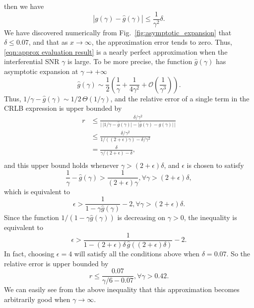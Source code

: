 \documentclass[12pt,draftclsnofoot,journal,onecolumn]{IEEEtran}
\theoremstyle{nonumberplain}
\begin{document}
    then we have 
    \begin{equation}
        \left| g(\gamma) - \hat{g}(\gamma)\right| \leq \frac{1}{\gamma^2} \delta. 
    \end{equation}
    We have discovered numerically from Fig.~\ref{fig:asymptotic_expansion} that $\delta \leq 0.07$, and that as $x\to \infty$, the approximation error tends to zero. Thus, \eqref{eqn:approx evaluation result} is a nearly perfect approximation when the interferential SNR $\gamma$ is large. To be more precise, the function $\hat{g}(\gamma)$ has asymptotic expansion at $\gamma \to +\infty$
    \begin{equation}
        \hat{g}(\gamma) \sim \frac{1}{2}\left(\frac{1}{\gamma} + \frac{1}{4\gamma^2} + \mathcal{O}(\frac{1}{\gamma^3})\right).
    \end{equation}
    Thus, $1/\gamma - \hat{g}(\gamma) \sim 1/2\,\Theta(1/\gamma)$, and the relative error of a single term in the CRLB expression is upper bounded by 
    \begin{equation}
        \begin{aligned}
        r & \leq \frac{\delta/\gamma^2}{\lvert \,\lvert 1/\gamma - \hat{g}(\gamma)\rvert - \lvert \hat{g}(\gamma) -  g(\gamma)\rvert\,\rvert} \\
        & \leq \frac{\delta/\gamma^2}{1/((2+\epsilon)\gamma) - \delta/\gamma^2} \\
        & = \frac{\delta}{\gamma/(2+\epsilon) - \delta}, \\
        \end{aligned}
    \end{equation}
    and this upper bound holds whenever $\gamma > (2+\epsilon)\delta$, and $\epsilon$ is chosen to satisfy 
    \begin{equation}
        \frac{1}{\gamma} - \hat{g}(\gamma) > \frac{1}{(2+\epsilon)\gamma}, \forall \gamma > (2+\epsilon)\delta,
    \end{equation}
    which is equivalent to 
    \begin{equation}
        \epsilon > \frac{1}{1-\gamma \hat{g}(\gamma)}-2, \forall \gamma > (2+\epsilon)\delta.
    \end{equation}
    Since the function $ 1/(1-\gamma \hat{g}(\gamma))$ is decreasing on $\gamma>0$, the inequality is equivalent to 
    \begin{equation}
        \epsilon > \frac{1}{1-(2+\epsilon)\delta\, \hat{g}((2+\epsilon)\delta)}-2.
    \end{equation}
    In fact, choosing $\epsilon=4$ will satisfy all the conditions above when $\delta = 0.07$. So the relative error is upper bounded by 
    \begin{equation}
        r \leq \frac{0.07}{\gamma/6 - 0.07}, \forall \gamma > 0.42.
    \end{equation}
    We can easily see from the above inequality that this approximation becomes arbitrarily good when $\gamma\to\infty$.

\footnotesize
\balance 


\end{document}
